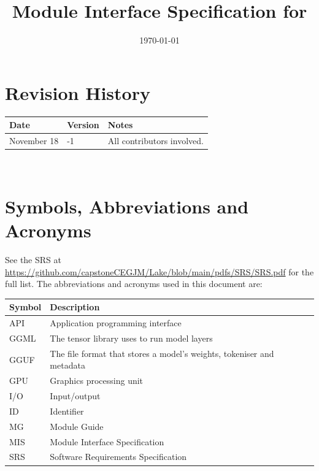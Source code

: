 \documentclass[12pt, titlepage]{article}
\begin{document}
\title{Module Interface Specification for \progname{}}

\author{\authname}

\date{\today}

\maketitle


\section{Revision History}

\begin{tabularx}{\textwidth}{p{3cm}p{2cm}X}
\toprule {\bf Date} & {\bf Version} & {\bf Notes}\\
\midrule
November 18 & -1 & All contributors involved.\\
\bottomrule
\end{tabularx}

~\newpage

\section{Symbols, Abbreviations and Acronyms}

See the SRS at
\url{https://github.com/capstoneCEGJM/Lake/blob/main/pdfs/SRS/SRS.pdf} for the
full list. The abbreviations and acronyms used in this document are:

\begin{center}
\renewcommand{\arraystretch}{1.2}
\begin{tabular}{l p{11cm}}
\toprule
\textbf{Symbol} & \textbf{Description} \\
\midrule
API & Application programming interface \\
GGML & The tensor library \progname{} uses to run model layers \\
GGUF & The file format that stores a model's weights, tokeniser and metadata \\
GPU & Graphics processing unit \\
I/O & Input/output \\
ID & Identifier \\
MG & Module Guide \\
MIS & Module Interface Specification \\
SRS & Software Requirements Specification \\
\bottomrule
\end{tabular}
\end{center}
\end{document}
